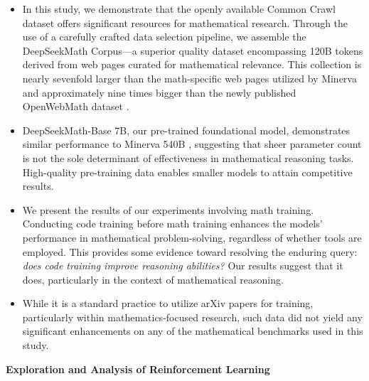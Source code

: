 \begin{itemize}[topsep=0pt]
    \item In this study, we demonstrate that the openly available Common Crawl dataset offers significant resources for mathematical research. Through the use of a carefully crafted data selection pipeline, we assemble the DeepSeekMath Corpus—a superior quality dataset encompassing 120B tokens derived from web pages curated for mathematical relevance. This collection is nearly sevenfold larger than the math-specific web pages utilized by Minerva \citep{minerva} and approximately nine times bigger than the newly published OpenWebMath dataset \citep{openwebmath}.

\item DeepSeekMath-Base 7B, our pre-trained foundational model, demonstrates similar performance to Minerva 540B \citep{minerva}, suggesting that sheer parameter count is not the sole determinant of effectiveness in mathematical reasoning tasks. High-quality pre-training data enables smaller models to attain competitive results.

\item We present the results of our experiments involving math training. Conducting code training before math training enhances the models' performance in mathematical problem-solving, regardless of whether tools are employed. This provides some evidence toward resolving the enduring query: \textit{does code training improve reasoning abilities?} Our results suggest that it does, particularly in the context of mathematical reasoning.

\item While it is a standard practice to utilize arXiv papers for training, particularly within mathematics-focused research, such data did not yield any significant enhancements on any of the mathematical benchmarks used in this study.
\end{itemize}

\textbf{Exploration and Analysis of Reinforcement Learning}

